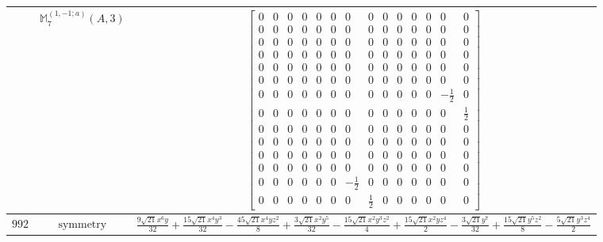 \documentclass[fleqn,8pt,landscape]{jsarticle}
\begin{document}
\begin{longtable}{ccc}
$  $ & $ \mathbb{M}_{7}^{(1,-1;a)}(A,3) $ & $ \begin{bmatrix} 0 & 0 & 0 & 0 & 0 & 0 & 0 & 0 & 0 & 0 & 0 & 0 & 0 & 0 \\ 0 & 0 & 0 & 0 & 0 & 0 & 0 & 0 & 0 & 0 & 0 & 0 & 0 & 0 \\ 0 & 0 & 0 & 0 & 0 & 0 & 0 & 0 & 0 & 0 & 0 & 0 & 0 & 0 \\ 0 & 0 & 0 & 0 & 0 & 0 & 0 & 0 & 0 & 0 & 0 & 0 & 0 & 0 \\ 0 & 0 & 0 & 0 & 0 & 0 & 0 & 0 & 0 & 0 & 0 & 0 & 0 & 0 \\ 0 & 0 & 0 & 0 & 0 & 0 & 0 & 0 & 0 & 0 & 0 & 0 & 0 & 0 \\ 0 & 0 & 0 & 0 & 0 & 0 & 0 & 0 & 0 & 0 & 0 & 0 & - \frac{1}{2} & 0 \\ 0 & 0 & 0 & 0 & 0 & 0 & 0 & 0 & 0 & 0 & 0 & 0 & 0 & \frac{1}{2} \\ 0 & 0 & 0 & 0 & 0 & 0 & 0 & 0 & 0 & 0 & 0 & 0 & 0 & 0 \\ 0 & 0 & 0 & 0 & 0 & 0 & 0 & 0 & 0 & 0 & 0 & 0 & 0 & 0 \\ 0 & 0 & 0 & 0 & 0 & 0 & 0 & 0 & 0 & 0 & 0 & 0 & 0 & 0 \\ 0 & 0 & 0 & 0 & 0 & 0 & 0 & 0 & 0 & 0 & 0 & 0 & 0 & 0 \\ 0 & 0 & 0 & 0 & 0 & 0 & - \frac{1}{2} & 0 & 0 & 0 & 0 & 0 & 0 & 0 \\ 0 & 0 & 0 & 0 & 0 & 0 & 0 & \frac{1}{2} & 0 & 0 & 0 & 0 & 0 & 0 \end{bmatrix} $ \\ \hline
$ 992 $ & $ \text{symmetry} $ & $ \frac{9 \sqrt{21} x^{6} y}{32} + \frac{15 \sqrt{21} x^{4} y^{3}}{32} - \frac{45 \sqrt{21} x^{4} y z^{2}}{8} + \frac{3 \sqrt{21} x^{2} y^{5}}{32} - \frac{15 \sqrt{21} x^{2} y^{3} z^{2}}{4} + \frac{15 \sqrt{21} x^{2} y z^{4}}{2} - \frac{3 \sqrt{21} y^{7}}{32} + \frac{15 \sqrt{21} y^{5} z^{2}}{8} - \frac{5 \sqrt{21} y^{3} z^{4}}{2} $ \\

\end{longtable}
\end{document}
